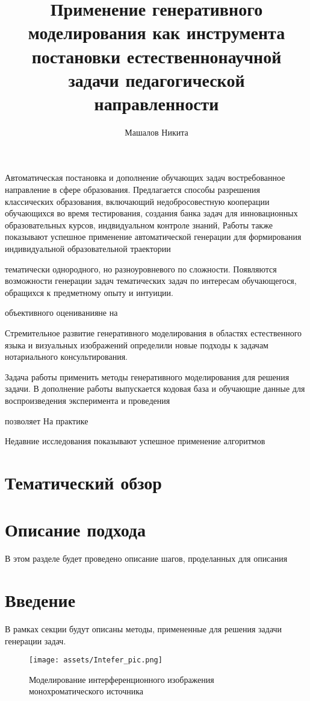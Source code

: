 \documentclass{mipt-thesis-bs}
\title{Применение генеративного моделирования как инструмента постановки естественнонаучной задачи педагогической направленности}
\author{Машалов Никита}
\begin{document}
Автоматическая постановка и дополнение обучающих задач востребованное направление в сфере образования. 
Предлагается способы разрешения классических образования, включающий недобросовестную кооперации обучающихся во время тестирования, создания банка задач для инновационных образовательных курсов,
индвидуальном контроле знаний, Работы также показывают успешное применение автоматической генерации для формирования индивидуальной образовательной траектории

 тематически однородного, но разноуровневого по сложности. Появляются возможности генерации задач тематических задач по интересам обучающегося, обращихся к предметному опыту и интуиции.

объективного оцениванияне на  

Стремительное развитие генеративного моделирования 
в областях естественного языка  и
визуальных изображений \cite{rombach2022highresolution}\cite{song2020generative} определили
новые подходы к задачам нотариального консультирования.

Задача работы применить методы генеративного моделирования для решения задачи. В дополнение работы 
выпускается кодовая база и обучающие данные для воспроизведения эксперимента и проведения


позволяет
На практике 


Недавние исследования показывают
успешное применение алгоритмов 

\chapter{Тематический обзор}



\chapter{Описание подхода}

В этом разделе будет проведено описание шагов, проделанных для описания


\chapter{Введение}

В рамках секции будут описаны методы, примененные для решения задачи генерации задач.


\begin{figure}[h]
    \centering
    \texttt{[image: assets/Intefer\_pic.png]}
    \caption{Моделирование интерференционного изображения монохроматического источника}
    \label{fig_NewtonRings}
\end{figure}
\end{document}
